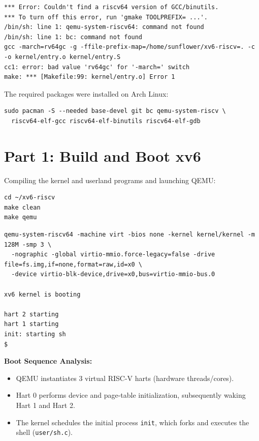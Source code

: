 \documentclass[12pt,a4paper]{article}
\begin{document}
\begin{lstlisting}[style=consolestyle]
*** Error: Couldn't find a riscv64 version of GCC/binutils.
*** To turn off this error, run 'gmake TOOLPREFIX= ...'.
/bin/sh: line 1: qemu-system-riscv64: command not found
/bin/sh: line 1: bc: command not found
gcc -march=rv64gc -g -ffile-prefix-map=/home/sunflower/xv6-riscv=. -c -o kernel/entry.o kernel/entry.S
cc1: error: bad value 'rv64gc' for '-march=' switch
make: *** [Makefile:99: kernel/entry.o] Error 1
\end{lstlisting}

The required packages were installed on Arch Linux:
\begin{lstlisting}[style=bashstyle]
sudo pacman -S --needed base-devel git bc qemu-system-riscv \
  riscv64-elf-gcc riscv64-elf-binutils riscv64-elf-gdb
\end{lstlisting}

\section{Part 1: Build and Boot xv6}

Compiling the kernel and userland programs and launching QEMU:
\begin{lstlisting}[style=bashstyle]
cd ~/xv6-riscv
make clean
make qemu
\end{lstlisting}

\begin{lstlisting}[style=consolestyle]
qemu-system-riscv64 -machine virt -bios none -kernel kernel/kernel -m 128M -smp 3 \
  -nographic -global virtio-mmio.force-legacy=false -drive file=fs.img,if=none,format=raw,id=x0 \
  -device virtio-blk-device,drive=x0,bus=virtio-mmio-bus.0

xv6 kernel is booting

hart 2 starting
hart 1 starting
init: starting sh
$
\end{lstlisting}

\textbf{Boot Sequence Analysis:}
\begin{itemize}
    \item QEMU instantiates 3 virtual RISC-V harts (hardware threads/cores).
    \item Hart 0 performs device and page-table initialization, subsequently waking Hart 1 and Hart 2.
    \item The kernel schedules the initial process \texttt{init}, which forks and executes the shell (\texttt{user/sh.c}).
\end{itemize}
\end{document}

